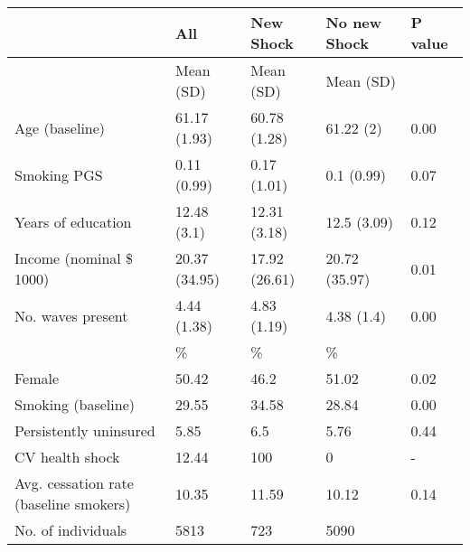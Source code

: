 % 
\begin{tabular}{lllll}
  \toprule
\textbf{  } & \textbf{ All } & \textbf{ New Shock } & \textbf{ No new Shock } & \textbf{ P value } \\ 
  \midrule
 & Mean (SD) & Mean (SD) & Mean (SD) &  \\ 
   \midrule
Age (baseline) & 61.17 (1.93) & 60.78 (1.28) & 61.22 (2) & 0.00 \\ 
  Smoking PGS & 0.11 (0.99) & 0.17 (1.01) & 0.1 (0.99) & 0.07 \\ 
  Years of education & 12.48 (3.1) & 12.31 (3.18) & 12.5 (3.09) & 0.12 \\ 
  Income (nominal \$ 1000) & 20.37 (34.95) & 17.92 (26.61) & 20.72 (35.97) & 0.01 \\ 
  No. waves present & 4.44 (1.38) & 4.83 (1.19) & 4.38 (1.4) & 0.00 \\ 
   & \% & \% & \% &  \\ 
  Female & 50.42 & 46.2 & 51.02 & 0.02 \\ 
  Smoking (baseline) & 29.55 & 34.58 & 28.84 & 0.00 \\ 
  Persistently uninsured & 5.85 & 6.5 & 5.76 & 0.44 \\ 
  CV health shock & 12.44 & 100 & 0 & - \\ 
  Avg. cessation rate (baseline smokers) & 10.35 & 11.59 & 10.12 & 0.14 \\ 
  No. of individuals & 5813 & 723 & 5090 &  \\ 
   \bottomrule
\end{tabular}
